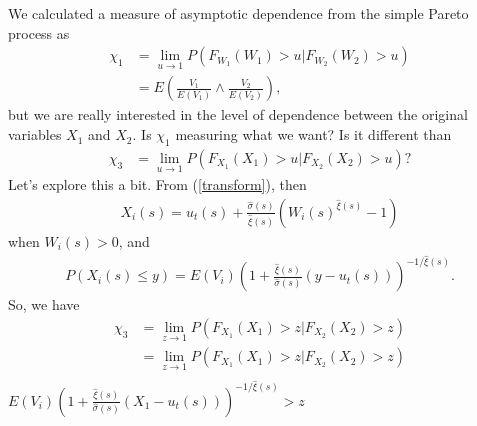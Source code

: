 \documentclass[12pt]{article}
\begin{document}
We calculated a measure of asymptotic dependence from the simple Pareto process as
\begin{align*}
\chi_1 &= \lim_{u\rightarrow 1} P(F_{W_1}(W_1) > u | F_{W_2}(W_2) > u) \\
&= E\left(\frac{V_1}{E(V_1)} \wedge \frac{V_2}{E(V_2)}\right),
\end{align*}
but we are really interested in the level of dependence between the original variables $X_1$ and $X_2$. Is $\chi_1$ measuring what we want? Is it different than
\begin{align*}
\chi_3 &= \lim_{u\rightarrow 1} P(F_{X_1}(X_1) > u | F_{X_2}(X_2) > u)?
\end{align*}
Let's explore this a bit. From (\ref{transform}), then
\begin{align}
X_i(s) = u_t(s) + \frac{\hat{\sigma}(s)}{\hat{\xi}(s)}\left(W_i(s)^{\hat{\xi}(s)}-1\right)
\end{align}
when $W_i(s)>0$, and
\begin{align}
P(X_i(s) \leq y) = E(V_i)\left(1+\frac{\hat{\xi}(s)}{\hat{\sigma}(s)}\left(y - u_t(s)\right)\right)^{-1/\hat{\xi}(s)}.
\end{align}
So, we have
\begin{align*}
\chi_3 &= \lim_{z\rightarrow 1} P(F_{X_1}(X_1) > z | F_{X_2}(X_2) > z) \\
 &= \lim_{z\rightarrow 1} P(F_{X_1}(X_1) > z | F_{X_2}(X_2) > z) \\
\end{align*}
$E(V_i)\left(1+\frac{\hat{\xi}(s)}{\hat{\sigma}(s)}\left(X_1 - u_t(s)\right)\right)^{-1/\hat{\xi}(s)}>z$



\end{document}
